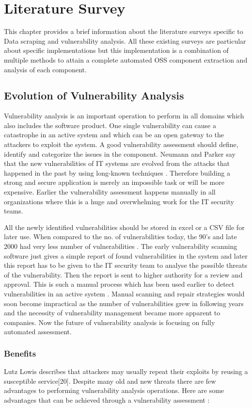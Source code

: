 %
\section{Literature Survey}\label{sec:literature survey}
%
This chapter provides a brief information about the literature surveys specific to Data scraping and vulnerability analysis. All these existing surveys are particular about specific implementations but this implementation is a combination of multiple methods to attain a complete automated OSS component extraction and analysis of each component.
%
\subsection{Evolution of Vulnerability Analysis}
Vulnerability analysis is an important operation to perform in all domains which also includes the software product. One single vulnerability can cause a catastrophe in an active system and which can be an open gateway to the attackers to exploit the system. A good vulnerability assessment should define, identify and categorize the issues in the component\cite{LinRo2021}. 
Neumann and Parker say that the new vulnerabilities of IT systems are evolved from the attacks that happened in the past by using long-known techniques \cite{NePa1989}. Therefore building a strong and secure application is merely an impossible task or will be more expensive. Earlier the vulnerability assessment happens manually in all organizations where this is a huge and overwhelming work for the IT security teams. 

All the newly identified vulnerabilities should be stored in excel or a CSV file for later use. When compared to the no. of vulnerabilities today, the 90’s and late 2000 had very less number of vulnerabilities \cite{Rh2019}. The early vulnerability scanning software just gives a simple report of found vulnerabilities in the system and later this report has to be given to the IT security team to analyse the possible threats of the vulnerability. Then the report is sent to higher authority for a review and approval. This is such a manual process which has been used earlier to detect vulnerabilities in an active system \cite{Rh2019}. Manual scanning and repair strategies would soon become impractical as the number of vulnerabilities grew in following years and the necessity of vulnerability management became more apparent to companies. Now the future of vulnerability analysis is focusing on fully automated assessment.
\subsubsection{Benefits}
Lutz Lowis describes that attackers may usually repeat their exploits by reusing a susceptible service[20]. Despite many old and new threats there are few advantages to performing vulnerability analysis operations. Here are some advantages that can be achieved through a vulnerability assessment \cite{LoAc2011} \cite{Rh2019} \cite{VulTest}:

